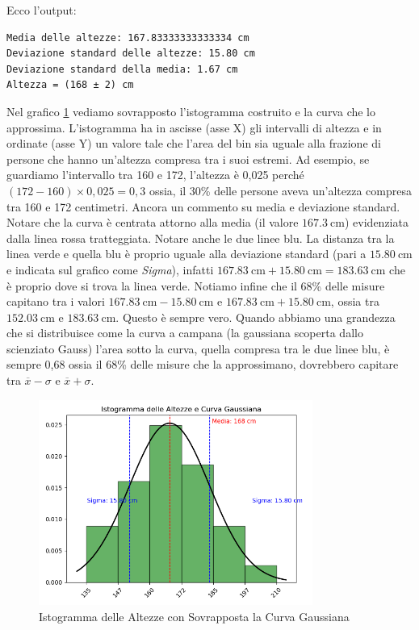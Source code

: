 \documentclass{article}
\begin{document}
Ecco l'output:
\begin{verbatim}
Media delle altezze: 167.83333333333334 cm
Deviazione standard delle altezze: 15.80 cm
Deviazione standard della media: 1.67 cm
Altezza = (168 ± 2) cm
\end{verbatim}
Nel grafico \ref{fig:istogramma} vediamo sovrapposto l'istogramma costruito e la curva che lo approssima. L'istogramma ha in ascisse (asse X) gli intervalli di altezza e in ordinate (asse Y) un valore tale che l'area del bin sia uguale alla frazione di persone che hanno un'altezza compresa tra i suoi estremi. Ad esempio, se guardiamo l'intervallo tra 160 e 172, l'altezza è 0,025 perché $\left(172-160 \right)\times 0,025 =0,3$ ossia, il 30\% delle persone aveva un'altezza compresa tra 160 e 172 centimetri. Ancora un commento su media e deviazione standard. Notare che la curva è centrata attorno alla media (il valore $\SI{167,3}{\centi\meter}$) evidenziata dalla linea rossa tratteggiata. Notare anche le due linee blu. La distanza tra la linea verde e quella blu è proprio uguale alla deviazione standard (pari a $\SI{15,80}{\centi\meter}$ e indicata sul grafico come \textit{Sigma}), infatti $\SI{167,83}{\centi\meter} + \SI{15,80}{\centi\meter} = \SI{183,63}{\centi\meter}$ che è proprio dove si trova la linea verde. Notiamo infine che il 68\% delle misure capitano tra i valori $\SI{167,83}{\centi\meter} -\SI{15,80}{\centi\meter}$ e $\SI{167,83}{\centi\meter} +\SI{15,80}{\centi\meter}$, ossia tra $\SI{152,03}{\centi\meter}$ e $\SI{183,63}{\centi\meter}$. Questo è sempre vero. Quando abbiamo una grandezza che si distribuisce come la curva a campana (la gaussiana scoperta dallo scienziato Gauss) l'area sotto la curva, quella compresa tra le due linee blu, è sempre 0,68 ossia il 68\% delle misure che la approssimano, dovrebbero capitare tra $\overline{x} -\sigma$ e $\overline{x} + \sigma$.

\begin{figure}[h!]
    \centering
    \includegraphics[width=0.8\textwidth]{istogramma.png}
    \caption{Istogramma delle Altezze con Sovrapposta la Curva Gaussiana}
    \label{fig:istogramma}
\end{figure}
\end{document}

